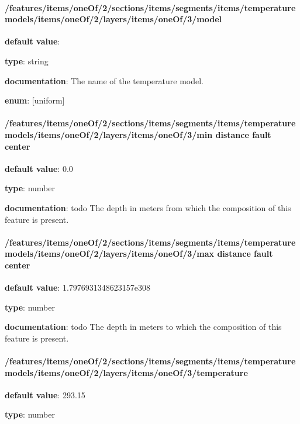 \paragraph{/features/items/oneOf/2/sections/items/segments/items/temperature models/items/oneOf/2/layers/items/oneOf/3/model} \begin{itemized}
\item {\bf default value}: 
\item {\bf type}: string
\item {\bf documentation}: The name of the temperature model.
\item {\bf enum}: [uniform]\end{itemized}\paragraph{/features/items/oneOf/2/sections/items/segments/items/temperature models/items/oneOf/2/layers/items/oneOf/3/min distance fault center} \begin{itemized}
\item {\bf default value}: 0.0
\item {\bf type}: number
\item {\bf documentation}: todo The depth in meters from which the composition of this feature is present.
\end{itemized}\paragraph{/features/items/oneOf/2/sections/items/segments/items/temperature models/items/oneOf/2/layers/items/oneOf/3/max distance fault center} \begin{itemized}
\item {\bf default value}: 1.7976931348623157e308
\item {\bf type}: number
\item {\bf documentation}: todo The depth in meters to which the composition of this feature is present.
\end{itemized}\paragraph{/features/items/oneOf/2/sections/items/segments/items/temperature models/items/oneOf/2/layers/items/oneOf/3/temperature} \begin{itemized}
\item {\bf default value}: 293.15
\item {\bf type}: number

\end{itemized}
